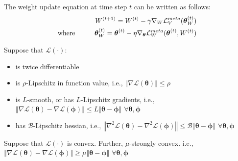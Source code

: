 The weight update equation at time step $t$ can be written as follows:
\begin{equation}
    \begin{aligned}
        {W}^{(t+1)} = {W}^{(t)} - \gamma\nabla_{W}\mathcal{L}_{V}^{meta}(\boldsymbol{\theta}^{(t)}_{W})\\
        \text{where\hspace{1cm}}\boldsymbol{\theta}^{(t)}_{W} = \boldsymbol{\theta}^{(t)} - \eta \nabla_{\boldsymbol{\theta}}\mathcal{L}_{W}^{meta}(\boldsymbol{\theta}^{(t)}, W^{(t)})\\
    \end{aligned}
    \label{online-equation-weight-1}
\end{equation}


\begin{assumption} {} Suppose that $\mathcal{L}(\cdot)$:
\begin{itemize}
    \item is twice differentiable
    \item is $\rho$-Lipschitz in function value, i.e., $\left\Vert\nabla \mathcal{L}(\boldsymbol{\theta})\right\Vert \leq \rho$
    \item is $L$-smooth, or has $L$-Lipschitz gradients, i.e., $\left\Vert\nabla \mathcal{L}(\boldsymbol{\theta}) - \nabla \mathcal{L}(\boldsymbol{\phi})\right\Vert \leq L \left\Vert\boldsymbol{\theta} - \boldsymbol{\phi}\right\Vert$ $\forall{\boldsymbol{\theta}, \boldsymbol{\phi}}$
    \item has $\mathcal{B}$-Lipschitz hessian, i.e., $\left\Vert\nabla^2 \mathcal{L}(\boldsymbol{\theta}) - \nabla^2  \mathcal{L}(\boldsymbol{\phi})\right\Vert \leq  \mathcal{B} \left\Vert\boldsymbol{\theta} - \boldsymbol{\phi}\right\Vert$ $\forall {\boldsymbol{\theta}, \boldsymbol{\phi}}$
\end{itemize}
\end{assumption}

\begin{assumption} {}
  Suppose that $\mathcal{L}(\cdot)$ is convex. Further, $\mu$-strongly convex. i.e., $\left\Vert\nabla \mathcal{L}(\boldsymbol{\theta}) - \nabla \mathcal{L}(\boldsymbol{\phi})\right\Vert \geq \mu \left\Vert\boldsymbol{\theta} - \boldsymbol{\phi}\right\Vert$ $\forall{\boldsymbol{\theta}, \boldsymbol{\phi}}$\\
\end{assumption}

